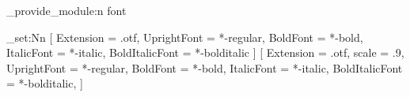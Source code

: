 \hduthesis_provide_module:n {font}

\RequirePackage[zihao = -4]{ctex}
\linespread{1.39}
\dim_set:Nn \parindent {2\ccwd}
\newcommand\semilarge{\@setfontsize\semilarge{14}{16.5}}
\newcommand\semiLarge{\@setfontsize\semiLarge{16.5}{18}}
\setmainfont{texgyretermes}
  [
    Extension = .otf, UprightFont = *-regular, BoldFont = *-bold,
    ItalicFont = *-italic, BoldItalicFont = *-bolditalic
  ]
\setsansfont{texgyreheros}
  [
    Extension = .otf, scale = .9, UprightFont = *-regular, BoldFont = *-bold,
    ItalicFont = *-italic, BoldItalicFont = *-bolditalic,
  ]

\RequirePackage { amsmath, amssymb, mathtools, extarrows,
                  bm, cancel, physics2, fixdif, derivative }

\endinput
